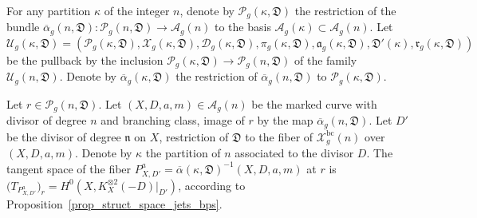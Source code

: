\documentclass[JEP,XML,SOM,Unicode,NoEqCountersInSection,published]{cedram}
\newcommand{\BC}{\mathrm{bc}}
\theoremstyle{definition}
\theoremstyle{plain}
\begin{document}
For any partition $\kappa$ of the integer $n$, denote by $\mathcal P_g(\kappa, \mathfrak D)$ the restriction of the bundle $\overline \alpha_g(n, \mathfrak D): \mathcal P_g(n, \mathfrak D) \to \mathcal A_g(n)$ to the basis $\mathcal A_g(\kappa) \subset \mathcal A_g(n)$.
Let
\[
\mathcal U_g(\kappa, \mathfrak D) = (\mathcal P_g(\kappa, \mathfrak D), \mathcal X_g(\kappa, \mathfrak D), \mathcal D_g(\kappa, \mathfrak D), \pi_g(\kappa, \mathfrak D), \mathfrak a_g(\kappa, \mathfrak D), \mathfrak D'(\kappa), \mathfrak r_g(\kappa, \mathfrak D))
\]
be the pullback by the inclusion $\mathcal P_g(\kappa, \mathfrak D) \to \mathcal P_g(n, \mathfrak D)$ of the family $\mathcal U_g(n, \mathfrak D)$.
Denote by $\overline \alpha_g(\kappa, \mathfrak D)$ the restriction of $\overline \alpha_g(n, \mathfrak D)$ to $\mathcal P_g(\kappa, \mathfrak D)$.

Let $r \in \mathcal P_g(n, \mathfrak D)$.
Let $(X, D, a, m) \in \mathcal A_g(n)$ be the marked curve with divisor of degree $n$ and branching class, image of $r$ by the map $\overline \alpha_g(n, \mathfrak D)$.
Let $D'$ be the divisor of degree $\mathfrak n$ on $X$, restriction of $\mathfrak D$ to the fiber of $\mathcal X_g^{\BC}(n)$ over $(X, D, a, m)$.
Denote by $\kappa$ the partition of $n$ associated to the divisor $D$.
The tangent space of the fiber $P_{X, D'}^a = \overline \alpha(\kappa, \mathfrak D)^{-1}(X, D, a, m)$ at $r$ is $\bigl(T_{P_{X, D'}^a}\bigr)_r = H^0(X, K_X^{\otimes 2}(-D)|_{D'})$, according to Proposition~\ref{prop_struct_space_jets_bps}.
\end{document}
